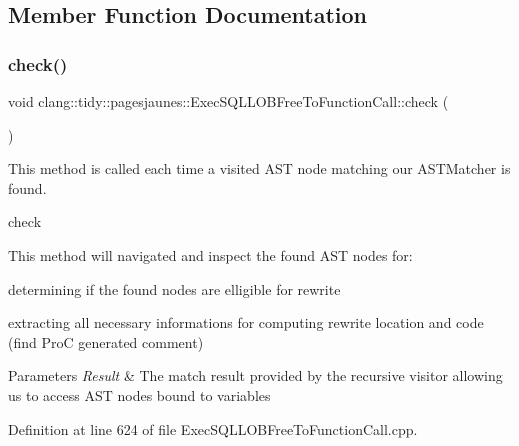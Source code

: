 \subsection{Member Function Documentation}
\mbox{\label{classclang_1_1tidy_1_1pagesjaunes_1_1_exec_s_q_l_l_o_b_free_to_function_call_abf8924b6b17a361096fc755a9a637a97}} 
\subsubsection{\texorpdfstring{check()}{check()}}
{\footnotesize\ttfamily void clang\+::tidy\+::pagesjaunes\+::\+Exec\+S\+Q\+L\+L\+O\+B\+Free\+To\+Function\+Call\+::check (\begin{DoxyParamCaption}\item[{const ast\+\_\+matchers\+::\+Match\+Finder\+::\+Match\+Result \&}]{ }\end{DoxyParamCaption})\hspace{0.3cm}{\ttfamily [override]}}



This method is called each time a visited A\+ST node matching our A\+S\+T\+Matcher is found. 

check

This method will navigated and inspect the found A\+ST nodes for\+:
\begin{DoxyItemize}
\item determining if the found nodes are elligible for rewrite
\item extracting all necessary informations for computing rewrite location and code (find ProC generated comment)
\end{DoxyItemize}


\begin{DoxyParams}{Parameters}
{\em Result} & The match result provided by the recursive visitor allowing us to access A\+ST nodes bound to variables \\
\hline
\end{DoxyParams}


Definition at line 624 of file Exec\+S\+Q\+L\+L\+O\+B\+Free\+To\+Function\+Call.\+cpp.

